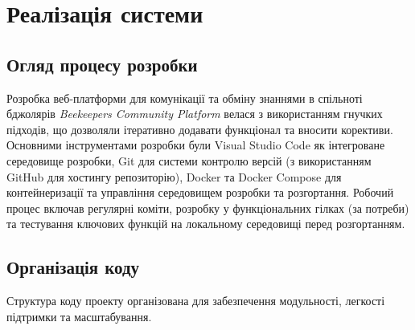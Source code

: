 \chapter{Реалізація системи}
\label{ch:implementation}

\section{Огляд процесу розробки}
\label{sec:dev_process}
Розробка веб-платформи для комунікації та обміну знаннями в спільноті бджолярів \textit{Beekeepers Community Platform} велася з використанням гнучких підходів, що дозволяли ітеративно додавати функціонал та вносити корективи. Основними інструментами розробки були Visual Studio Code як інтегроване середовище розробки, Git для системи контролю версій (з використанням GitHub для хостингу репозиторію), Docker та Docker Compose для контейнеризації та управління середовищем розробки та розгортання. Робочий процес включав регулярні коміти, розробку у функціональних гілках (за потреби) та тестування ключових функцій на локальному середовищі перед розгортанням.

\section{Організація коду}
\label{sec:code_organization}
Структура коду проекту організована для забезпечення модульності, легкості підтримки та масштабування.

